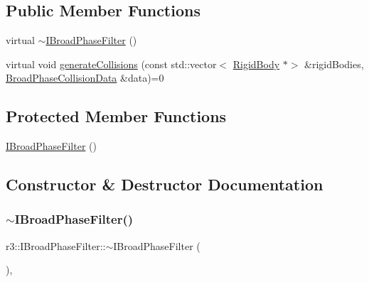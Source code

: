 \subsection*{Public Member Functions}
\begin{DoxyCompactItemize}
\item 
virtual \mbox{\hyperlink{classr3_1_1_i_broad_phase_filter_af6cd5cfcf4487d97916debae0011244f}{$\sim$\+I\+Broad\+Phase\+Filter}} ()
\item 
virtual void \mbox{\hyperlink{classr3_1_1_i_broad_phase_filter_a19bfa977243bcdd0ec143a0aca750649}{generate\+Collisions}} (const std\+::vector$<$ \mbox{\hyperlink{classr3_1_1_rigid_body}{Rigid\+Body}} $\ast$$>$ \&rigid\+Bodies, \mbox{\hyperlink{classr3_1_1_broad_phase_collision_data}{Broad\+Phase\+Collision\+Data}} \&data)=0
\end{DoxyCompactItemize}
\subsection*{Protected Member Functions}
\begin{DoxyCompactItemize}
\item 
\mbox{\hyperlink{classr3_1_1_i_broad_phase_filter_ab1eb5dc44548078aa0716eedbab8ac11}{I\+Broad\+Phase\+Filter}} ()
\end{DoxyCompactItemize}


\subsection{Constructor \& Destructor Documentation}
\mbox{\label{classr3_1_1_i_broad_phase_filter_af6cd5cfcf4487d97916debae0011244f}} 
\subsubsection{\texorpdfstring{$\sim$\+I\+Broad\+Phase\+Filter()}{~IBroadPhaseFilter()}}
{\footnotesize\ttfamily r3\+::\+I\+Broad\+Phase\+Filter\+::$\sim$\+I\+Broad\+Phase\+Filter (\begin{DoxyParamCaption}{ }\end{DoxyParamCaption})\hspace{0.3cm}{\ttfamily [virtual]}, {\ttfamily [default]}}

